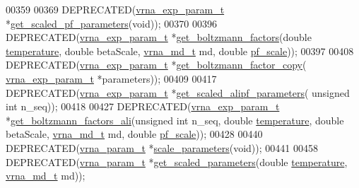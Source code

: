 \begin{DoxyCode}
00359 
00369 DEPRECATED(\hyperlink{group__energy__parameters_structvrna__exp__param__s}{vrna\_exp\_param\_t} *\hyperlink{group__energy__parameters_gabf3b9271c41dd3fac02d56e0b02b3344}{get\_scaled\_pf\_parameters}(\textcolor{keywordtype}{void}));
00370 
00396 DEPRECATED(\hyperlink{group__energy__parameters_structvrna__exp__param__s}{vrna\_exp\_param\_t} *\hyperlink{group__energy__parameters_gaef2b931c7e9d4ffb0a5c33df50ec2068}{get\_boltzmann\_factors}(\textcolor{keywordtype}{double} 
      \hyperlink{group__energy__parameters_aeed2cd83713012bcb52e431041e037c8}{temperature}, \textcolor{keywordtype}{double} betaScale, \hyperlink{group__model__details_structvrna__md__s}{vrna\_md\_t} md, \textcolor{keywordtype}{double} \hyperlink{group__model__details_gad3b22044065acc6dee0af68931b52cfd}{pf\_scale}));
00397 
00408 DEPRECATED(\hyperlink{group__energy__parameters_structvrna__exp__param__s}{vrna\_exp\_param\_t} *\hyperlink{group__energy__parameters_ga665a446ba8ff211e551297a8fa36ec27}{get\_boltzmann\_factor\_copy}(
      \hyperlink{group__energy__parameters_structvrna__exp__param__s}{vrna\_exp\_param\_t} *parameters));
00409 
00417 DEPRECATED(\hyperlink{group__energy__parameters_structvrna__exp__param__s}{vrna\_exp\_param\_t} *\hyperlink{group__energy__parameters_ga0ccf4e1be085a573533fd6b9da2d8cf9}{get\_scaled\_alipf\_parameters}(\textcolor{keywordtype}{
      unsigned} \textcolor{keywordtype}{int} n\_seq));
00418 
00427 DEPRECATED(\hyperlink{group__energy__parameters_structvrna__exp__param__s}{vrna\_exp\_param\_t} *\hyperlink{group__energy__parameters_ga2aa1d87c97f35d2e4121634a17556829}{get\_boltzmann\_factors\_ali}(\textcolor{keywordtype}{unsigned} \textcolor{keywordtype}{
      int} n\_seq, \textcolor{keywordtype}{double} \hyperlink{group__energy__parameters_aeed2cd83713012bcb52e431041e037c8}{temperature}, \textcolor{keywordtype}{double} betaScale, \hyperlink{group__model__details_structvrna__md__s}{vrna\_md\_t} md, \textcolor{keywordtype}{double} 
      \hyperlink{group__model__details_gad3b22044065acc6dee0af68931b52cfd}{pf\_scale}));
00428 
00440 DEPRECATED(\hyperlink{group__energy__parameters_structvrna__param__s}{vrna\_param\_t} *\hyperlink{group__energy__parameters_ga541f2cf7436e9bc939b0a49b24baf987}{scale\_parameters}(\textcolor{keywordtype}{void}));
00441 
00458 DEPRECATED(\hyperlink{group__energy__parameters_structvrna__param__s}{vrna\_param\_t} *\hyperlink{group__energy__parameters_ga7fa6a000d7c16feab939f2c4ee626197}{get\_scaled\_parameters}(\textcolor{keywordtype}{double} 
      \hyperlink{group__energy__parameters_aeed2cd83713012bcb52e431041e037c8}{temperature}, \hyperlink{group__model__details_structvrna__md__s}{vrna\_md\_t} md));

\end{DoxyCode}
